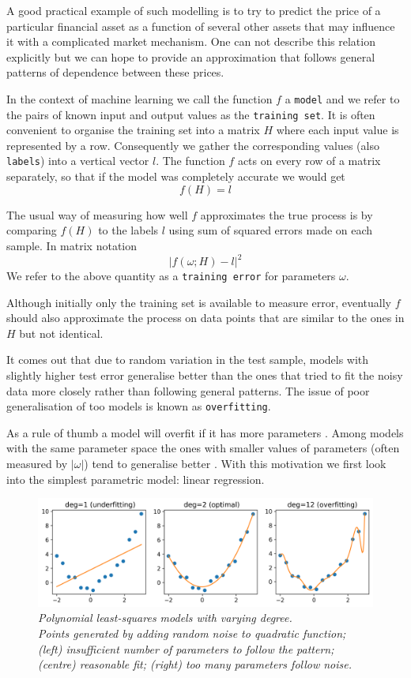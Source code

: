 \documentclass[a4paper,11pt]{article}
\theoremstyle{break}
\begin{document}
A good practical example of such modelling is to try to predict the price of a particular financial asset as a function of several other assets that may influence it with a complicated market mechanism. One can not describe this relation explicitly but we can hope to provide an approximation that follows general patterns of dependence between these prices.

In the context of machine learning we call the function $f$ a {\tt model} and we refer to the pairs of known input and output values as the {\tt training set}. It is often convenient to organise the training set into a matrix $H$ where each input value is represented by a row. Consequently we gather the corresponding values (also {\tt labels}) into a vertical vector $l$. The function $f$ acts on every row of a matrix separately, so that if the model was completely accurate we would get
    $$ f(H) = l $$

The usual way of measuring how well $f$ approximates the true process is by comparing $f(H)$ to the labels $l$ using sum of squared errors made on each sample. In matrix notation
$$ | f(\omega; H) - l |^2 $$
We refer to the above quantity as a {\tt training error} for parameters $\omega$.

Although initially only the training set is available to measure error, eventually $f$ should also approximate the process on data points that are similar to the ones in $H$ but not identical.

It comes out that due to random variation in the test sample,  models with slightly higher test error generalise better than the ones that tried to fit the noisy data more closely rather than following general patterns.
The issue of poor generalisation of too  models is known as {\tt overfitting}.

As a rule of thumb a model will overfit if it has more parameters \cite[pp112-113]{goodfellow}. Among models with the same parameter space the ones with smaller values of parameters (often measured by $ | \omega | $) tend to generalise better \cite[p119]{goodfellow}.
With this motivation we first look into the simplest parametric model: linear regression.

\begin{figure}[b]
\centering
\captionsetup{width=0.8\linewidth}
\includegraphics[width=0.8\linewidth]{polyfit.png}
\caption[]{
    \textit{Polynomial least-squares models with varying degree. \\
    Points generated by adding random noise to quadratic function;
    (left) insufficient number of parameters to follow the pattern;
    (centre) reasonable fit;
    (right) too many parameters follow noise.}
}
\end{figure} 
\end{document}
